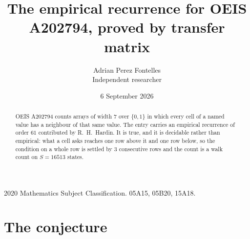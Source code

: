 \documentclass[11pt,a4paper]{article}
\title{The empirical recurrence for OEIS A202794, proved by transfer matrix}
\author{Adrian Perez Fontelles\\ \small Independent researcher}
\date{6 September 2026}
\theoremstyle{plain}
\theoremstyle{definition}
\begin{document}
\maketitle

\begin{abstract}
OEIS A202794 counts arrays of width $7$ over $\{0,1\}$ in which every cell of a named value has a neighbour of that same value. The entry carries an
empirical recurrence of order $61$ contributed by R.~H.~Hardin. It is true, and it is
decidable rather than empirical: what a cell asks reaches one row above it and one row below, so the
condition on a whole row is settled by $3$ consecutive rows and the count is a walk
count on $S=16513$ states.
\end{abstract}

\noindent\small 2020 Mathematics Subject Classification. 05A15, 05B20, 15A18.\normalsize

\section{The conjecture}
\end{document}

